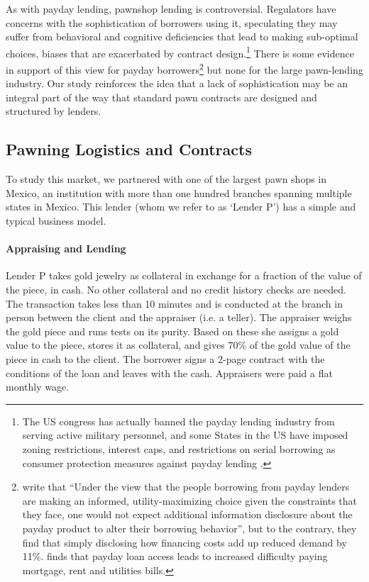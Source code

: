 \documentclass[12pt, a4paper]{article}
\begin{document}


As with payday lending, pawnshop lending is controversial. Regulators have concerns with the sophistication of borrowers using it, speculating they may suffer from behavioral and cognitive deficiencies that lead to making sub-optimal choices, biases that are exacerbated by contract design.\footnote{The US congress has actually banned the payday lending industry from serving active military personnel, and some States in the US have imposed zoning restrictions, interest caps, and restrictions on serial borrowing as consumer protection measures against payday lending \citep{Payday}.} There is some evidence in support of this view for payday borrowers\footnote{\cite{Bertrand} write that ``Under the view that the people borrowing from payday lenders are making an informed, utility-maximizing choice given the constraints that they face, one would not expect additional information disclosure about the payday product to alter their borrowing behavior'', but to the contrary, they find that simply disclosing how financing costs add up reduced demand by 11\%. \cite{Meltzer} finds that payday loan access leads to increased difficulty paying mortgage, rent and utilities bills.} but none for the large pawn-lending industry. Our study reinforces the idea that a lack of sophistication may be an integral part of the way that standard pawn contracts are designed and structured by lenders.



\subsection{Pawning Logistics and Contracts}

To study this market, we partnered with one of the largest pawn shops in Mexico, an institution with more than one hundred branches spanning multiple states in Mexico. This lender (whom we refer to as `Lender P') has a simple and typical business model. 

\paragraph*{Appraising and Lending} Lender P takes gold jewelry as collateral in exchange for a fraction of the value of the piece, in cash. No other collateral and no credit history checks are needed. The transaction takes less than 10 minutes and is conducted at the branch in person between the client and the appraiser (i.e. a teller).
The appraiser weighs the gold piece and runs tests on its purity. Based on these she assigns a gold value to the piece, stores it as collateral, and gives 70\% of the gold value of the piece in cash to the client. The borrower signs a 2-page contract with the conditions of the loan and leaves with the cash. Appraisers were paid a flat monthly wage.
\end{document}
